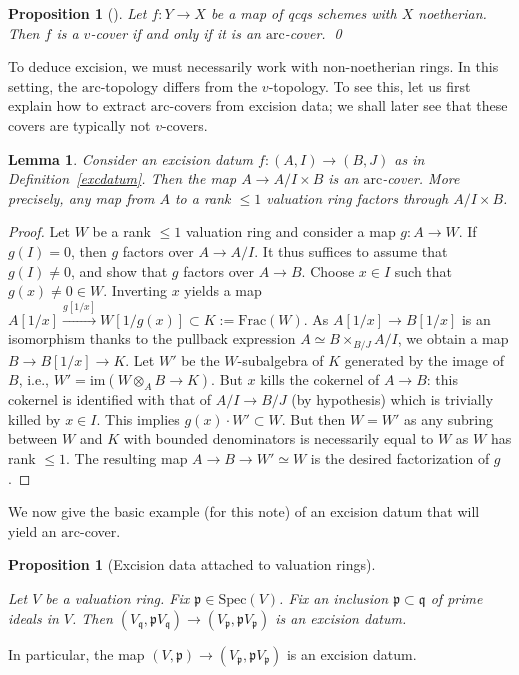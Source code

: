 \documentclass[reqno]{amsart}
\newcommand{\arc}{\mathrm{arc}}
\newtheorem{proposition}[theorem]{Proposition}
\newtheorem{lemma}[theorem]{Lemma}
\theoremstyle{definition}
\begin{document}
\begin{proposition}[{\cite[Theorem 2.8]{Rydh}}]
\label{Noetherianv}
Let $f\colon  Y \to X$ be a map of qcqs schemes with $X$ noetherian. Then $f$ is
a $v$-cover if and only if it is an $\arc$-cover.  \qed
\end{proposition} 

To deduce excision, we must necessarily work with non-noetherian rings. In this setting, the $\arc$-topology differs from the $v$-topology. To see this, let us first explain how to extract $\arc$-covers from excision data; we shall later see that these covers are typically not $v$-covers.

\begin{lemma} 
\label{excisionimpliesvleq1}
Consider an excision datum $f\colon  (A, I)  \to (B, J)$ as in
Definition~\ref{excdatum}. 
Then the map $A \to A/I \times B$ is an $\arc$-cover.
More precisely, any map from $A$ to a rank $\leq 1$ valuation ring factors
through $A/I \times B$. 
\end{lemma} 
\begin{proof} 
Let $W$ be a rank $\leq 1$ valuation ring and consider a map $g\colon  A \to W$.
If $g(I) = 0$, then $g$ factors over $A \to A/I$. It thus suffices to assume
that $g(I) \neq 0$, and show that $g$ factors over $A \to B$. Choose $x \in I$
such that $g(x) \neq 0 \in W$. Inverting $x$ yields a map $A[1/x]
\xrightarrow{g[1/x]} W[1/g(x)] \subset K := \mathrm{Frac}(W)$. As $A[1/x] \to
B[1/x]$ is an isomorphism thanks to the pullback expression $A \simeq B \times_{B/J}
A/I$, we obtain a map $B \to B[1/x] \to K$. Let $W'$ be the $W$-subalgebra of $K$ generated by the image of $B$, i.e., $W' = \mathrm{im}(W \otimes_A B \to K)$. But $x$ kills the cokernel of $A \to B$: this cokernel is identified with that of $A/I \to B/J$ (by hypothesis) which is trivially killed by $x \in I$. This implies $g(x) \cdot W' \subset W$. But then $W = W'$ as any subring between $W$ and $K$ with bounded denominators is necessarily equal to $W$ as $W$ has rank $\leq 1$. The resulting map $A \to B \to W' \simeq W$ is the desired factorization of $g$.
\end{proof} 


We now give the basic example (for this note) of an excision datum that will
yield an $\arc$-cover. 

\begin{proposition}[Excision data attached to valuation rings]
\label{AICValRingPrime}

Let $V$ be a valuation ring. Fix  $\mathfrak{p} \in \mathrm{Spec}(V)$. 
Fix an inclusion $\mathfrak{p}\subset \mathfrak{q}$ of prime ideals in $V$. Then $(V_{\mathfrak{q}},\mathfrak{p}V_{\mathfrak{q}}) \to (V_{\mathfrak{p}},\mathfrak{p}V_{\mathfrak{p}})$ is an excision datum.

\end{proposition}
In particular, the map $(V, \mathfrak{p}) \to (V_{\mathfrak{p}}, \mathfrak{p}
V_{\mathfrak{p}})$ is an excision datum. 
\end{document}
